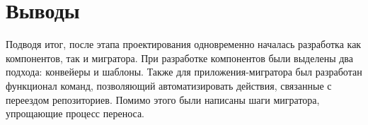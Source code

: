 \section{Выводы} \label{sec:impl-conclusion}

Подводя итог, после этапа проектирования одновременно началась разработка как компонентов, так и мигратора.
При разработке компонентов были выделены два подхода: конвейеры и шаблоны.
Также для приложения-мигратора был разработан функционал команд, позволяющий автоматизировать действия, связанные с переездом репозиториев.
Помимо этого были написаны шаги мигратора, упрощающие процесс переноса.
